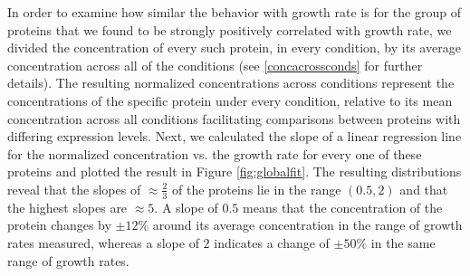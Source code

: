 In order to examine how similar the behavior with growth rate is for the group of proteins that we found to be strongly positively correlated with growth rate, we divided the concentration of every such protein, in every condition, by its average concentration across all of the conditions (see \ref{concacrossconds} for further details).
The resulting normalized concentrations across conditions represent the concentrations of the specific protein under every condition, relative to its mean concentration across all conditions facilitating comparisons between proteins with differing expression levels.
Next, we calculated the slope of a linear regression line for the normalized concentration vs. the growth rate for every one of these proteins and plotted the result in Figure \ref{fig:globalfit}.
The resulting distributions reveal that the slopes of $\approx \frac{2}{3}$ of the proteins lie in the range $(0.5,2)$ and that the highest slopes are $\approx 5$.
A slope of $0.5$ means that the concentration of the protein changes by $\pm12\%$ around its average concentration in the range of growth rates measured, whereas a slope of $2$ indicates a change of $\pm50\%$ in the same range of growth rates.